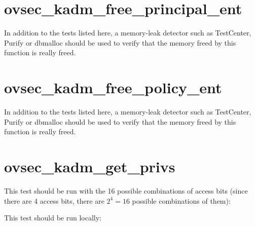 




\section{ovsec_kadm_free_principal_ent}

In addition to the tests listed here, a memory-leak detector such as
TestCenter, Purify or dbmalloc should be used to verify that the
memory freed by this function is really freed.




\section{ovsec_kadm_free_policy_ent}

In addition to the tests listed here, a memory-leak detector such as
TestCenter, Purify or dbmalloc should be used to verify that the
memory freed by this function is really freed.





\section{ovsec_kadm_get_privs}


This test should be run with the 16 possible combinations of access
bits (since there are 4 access bits, there are $2^4 = 16$ possible
combinations of them):


This test should be run locally:



